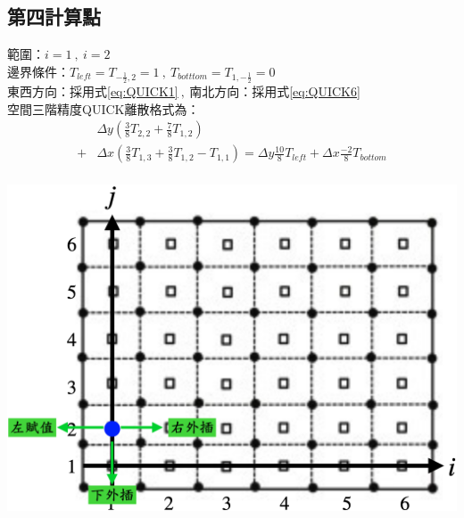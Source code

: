 \documentclass[12pt]{article}
\begin{document}
\subsection{第四計算點}
 \begin{minipage}{0.6\textwidth}
   \noindent 範圍：$i=1\ ,\ i=2$\\[1.5ex]
   \noindent 邊界條件：$T_{left} = T_{-\frac{1}{2},2}= 1\ ,\ T_{botttom} = T_{1,-\frac{1}{2}}= 0$\\[1.5ex]
   \noindent 東西方向：採用式\eqref{eq:QUICK1}$\ ,\ $南北方向：採用式\eqref{eq:QUICK6}\\[1.5ex]
   \noindent 空間三階精度QUICK離散格式為：
   \begin{equation*}\begin{split}
    &\Delta y(\frac{3}{8}T_{2,2} + \frac{7}{8}T_{1,2})\\[1.5ex]
   +&\Delta x(\frac{3}{8}T_{1,3} + \frac{3}{8}T_{1,2} - T_{1,1}) = \Delta y\frac{10}{8}T_{left} + \Delta x\frac{-2}{8}T_{bottom}\\
   \end{split}\end{equation*}
   \end{minipage}%
   \hfill
   \begin{minipage}{0.34\textwidth}
   \centering
   \includegraphics[width=\linewidth,height=9\baselineskip]{23.png}
   \label{fig:4th point}
\end{minipage}
\end{document}
